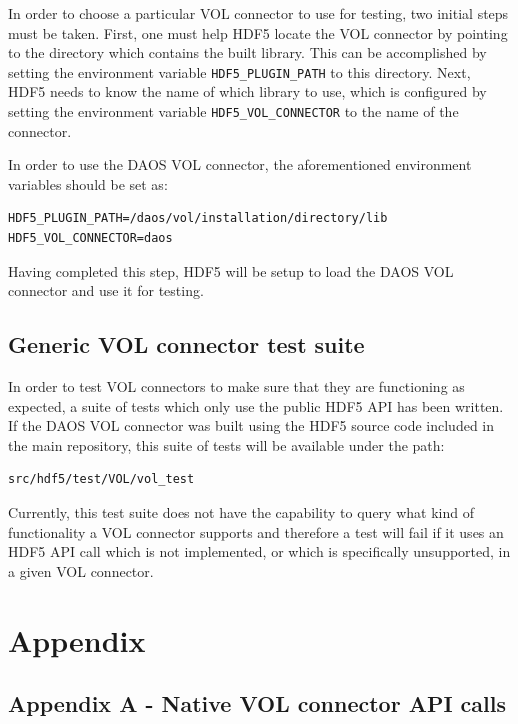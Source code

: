\documentclass[12pt]{article}
\begin{document}
In order to choose a particular VOL connector to use for testing, two initial steps must be taken. First, one must help HDF5 locate the VOL connector by pointing to the directory which contains the built library. This can be accomplished by setting the environment variable \texttt{HDF5\_PLUGIN\_PATH} to this directory. Next, HDF5 needs to know the name of which library to use, which is configured by setting the environment variable \texttt{HDF5\_VOL\_CONNECTOR} to the name of the connector.

In order to use the DAOS VOL connector, the aforementioned environment variables should be set as:

\begin{verbatim}
HDF5_PLUGIN_PATH=/daos/vol/installation/directory/lib
HDF5_VOL_CONNECTOR=daos
\end{verbatim}

Having completed this step, HDF5 will be setup to load the DAOS VOL connector and use it for testing.

\subsection{Generic VOL connector test suite}

In order to test VOL connectors to make sure that they are functioning as expected, a suite of tests which only use the public HDF5 API has been written. If the DAOS VOL connector was built using the HDF5 source code included in the main repository, this suite of tests will be available under the path:

\begin{verbatim}
src/hdf5/test/VOL/vol_test
\end{verbatim}

Currently, this test suite does not have the capability to query what kind of functionality a VOL connector supports and therefore a test will fail if it uses an HDF5 API call which is not implemented, or which is specifically unsupported, in a given VOL connector.

\newpage

\section{Appendix}

\subsection{Appendix A - Native VOL connector API calls}
\end{document}
